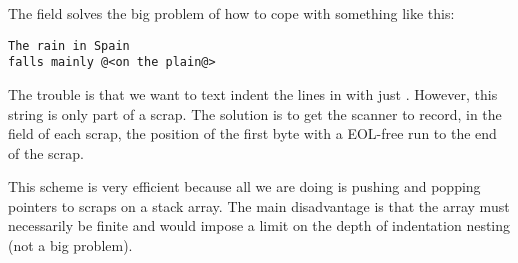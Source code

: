 The  field solves the big problem of
how to cope with something like this:

\begin{verbatim}
The rain in Spain
falls mainly @<on the plain@>
\end{verbatim}

The trouble is that we want to text indent the lines in
 with
just . However, this string is only part of a scrap. The
solution is to get the scanner to record, in the  field of each scrap,
the position of the first byte with a EOL-free run to the end of the scrap.

This scheme is very efficient because all we are doing is pushing and popping
pointers to scraps on a stack array. The main disadvantage is that the
array must necessarily be finite and would impose a limit on the depth
of indentation nesting (not a big problem).

